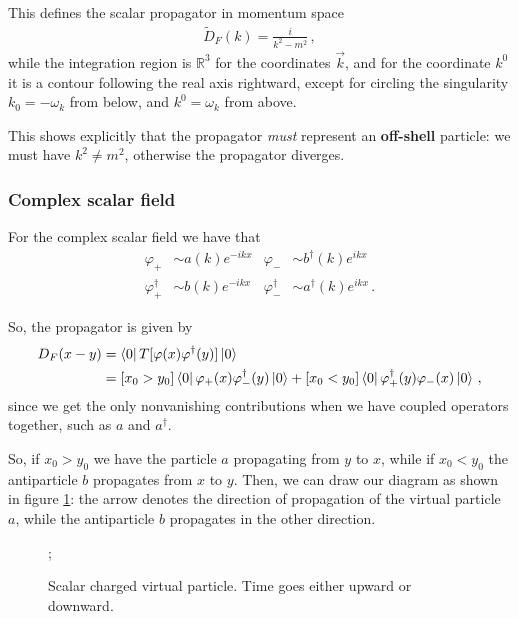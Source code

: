 \documentclass[main.tex]{subfiles}
\begin{document}
This defines the scalar propagator in momentum space 
%
\begin{align}
\widetilde{D}_{F}(k) = \frac{i}{k^2- m^2}
\,,
\end{align}
%
while the integration region is \(\mathbb{R}^{3}\) for the coordinates \(\vec{k}\), and for the coordinate \(k^{0}\) it is a contour following the real axis rightward, except for circling the singularity \(k_0 = - \omega_{k}\) from below, and \(k^{0} = \omega_{k}\) from above. 

This shows explicitly that the propagator \emph{must} represent an \textbf{off-shell} particle: we must have \(k^2 \neq m^2\), otherwise the propagator diverges.

\subsubsection{Complex scalar field}

For the complex scalar field we have that 
%
\begin{align}
\varphi_{+} &\sim a(k) e^{-ikx} 
&
\varphi_{-} &\sim b ^\dag(k) e^{ikx}  \\
\varphi_{+}^\dag &\sim b(k) e^{-ikx} 
&
\varphi_{-}^\dag &\sim a ^\dag(k) e^{ikx}
\,.
\end{align}

So, the propagator is given by 
%
\begin{align}
D_F (x-y) &= \bra{0} T [\varphi (x) \varphi ^\dag (y)] \ket{0}  \\
&= [x_0 > y_0 ] \bra{0} \varphi_{+} (x) \varphi_{-}^\dag(y) \ket{0}
+ [x_0 < y_0 ] \bra{0} \varphi_{+}^\dag(y) \varphi_{-}(x) \ket{0}
\,,
\end{align}
%
since we get the only nonvanishing contributions when we have coupled operators together, such as \(a \) and \(a ^\dag\). 

So, if \(x_0 > y_0 \) we have the particle \(a\) propagating from \(y\) to \(x\), while if \(x_0 < y_0 \) the antiparticle \(b\) propagates from \(x\) to \(y\). 
Then, we can draw our diagram as shown in figure \ref{fig:virtual-charged-scalar-particle-diagram}: the arrow denotes the direction of propagation of the virtual particle \(a\), while the antiparticle \(b\) propagates in the other direction. 

\begin{figure}[ht]
\centering
{};
\caption{Scalar charged virtual particle. Time goes either upward or downward.}
\label{fig:virtual-charged-scalar-particle-diagram}
\end{figure}
\end{document}
